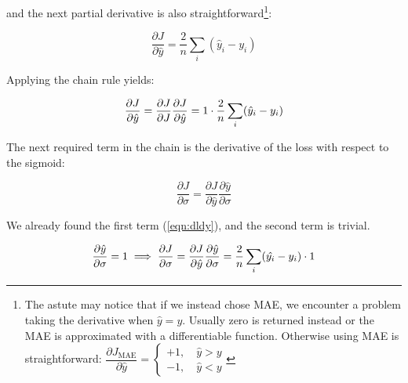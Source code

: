 


\noindent and the next partial derivative is also straightforward\footnote{The astute may notice that if we instead chose MAE, we encounter a problem taking the derivative when $ {\hat{y}=y} $. Usually zero is returned instead or the MAE is approximated with a differentiable function. Otherwise using MAE is straightforward: 
$
\dfrac{\partial J_\text{MAE}}{\partial \hat{y}} = 
\begin{cases}
  +1,\quad \hat{y} > y\\
  -1,\quad \hat{y} < y
\end{cases}
$
}:

\begin{equation}
\frac{\partial J}{\partial \hat{y}} = \frac{2}{n}\sum_i (\hat{y}_i - y_i )
\end{equation}

\noindent Applying the chain rule yields:

\begin{equation}
\label{eqn:dldy}
\frac{\partial J}{\partial \hat{y}} = \frac{\partial J}{\partial J}\frac{\partial J}{\partial \hat{y}} \\
= 1 \cdot \frac{2}{n} \sum_i (\hat{y}_i - y_i )
\end{equation}

\noindent The next required term in the chain is the derivative of the loss with respect to the sigmoid:

\begin{equation}
\frac{\partial J}{\partial \sigma} = \frac{\partial J}{\partial \hat{y}} \frac{\partial \hat{y}}{\partial \sigma}
\end{equation}

\noindent We already found the first term (\ref{eqn:dldy}), and the second term is trivial.

\begin{equation}
    \frac{\partial \hat{y}}{\partial \sigma} = 1 \\
    \implies \frac{\partial J}{\partial \sigma} =  \frac    {\partial J}{\partial \hat{y}} \frac{\partial \hat{y}}  {\partial \sigma} \\
    = \frac{2}{n} \sum_i (\hat{y_i} - y_i ) \cdot 1
\end{equation}

